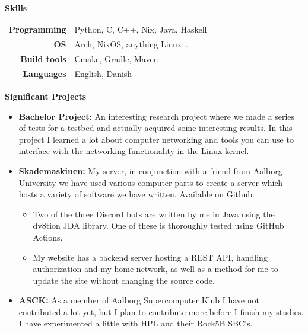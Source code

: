\documentclass[a4paper, 14pt]{article}
\newcommand{\myitem}[1]{\item[\color{myorange}$\circ$]#1}
\newcommand{\newcvsection}[2]{
    \noindent\huge \textbf{#1} \color{myorange}\hrulefill\color{black}
    
    \normalsize
    #2    
    \vspace{.5cm}
}
\begin{document}
    \newcvsection{Skills}{
        \begin{table}[H]
            \begin{tabular}{rl}
                \textbf{Programming} & Python, C, C++, Nix, Java, Haskell\\
                \textbf{OS} & Arch, NixOS, anything Linux... \\
                \textbf{Build tools} & Cmake, Gradle, Maven \\
                \textbf{Languages} & English, Danish
            \end{tabular}
        \end{table}
    }

    \newcvsection{Significant Projects}{
        \begin{itemize}
            \myitem{
                \textbf{Bachelor Project: } An interesting research project where we made a series of tests for a testbed and actually acquired some interesting results. 
                In this project I learned a lot about computer networking and tools you can use to interface with the networking functionality in the Linux kernel.
            }
            \myitem{
                \textbf{Skademaskinen: } My server, in conjunction with a friend from Aalborg University we have used various computer parts to create a server which hosts a variety of software we have written.
                Available on \href{https://github.com/Skademaskinen}{Github}.
                \begin{itemize}
                    \myitem{
                        Two of the three Discord bots are written by me in Java using the dv8tion JDA library. One of these is thoroughly tested using GitHub Actions.
                    }
                    \myitem{
                        My website has a backend server hosting a REST API, handling authorization and my home network, as well as a method for me to update the site without changing the source code.
                    }
                \end{itemize}
            }

            \myitem{
                \textbf{ASCK: } As a member of Aalborg Supercomputer Klub I have not contributed a lot yet, but I plan to contribute more before I finish my studies. 
                I have experimented a little with HPL and their Rock5B SBC's.
            }
        \end{itemize}
    }
    
\end{document}
